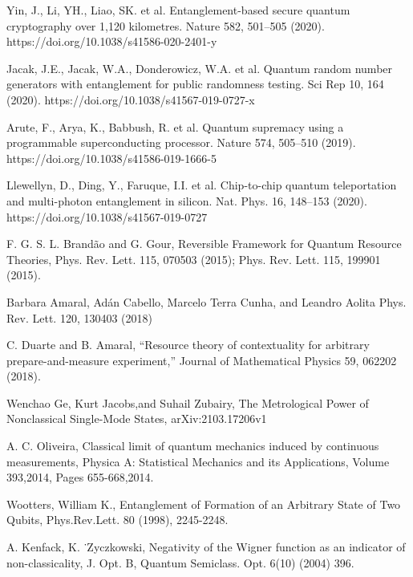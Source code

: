 \documentclass[aps,prl,preprint]{revtex4-1}
\begin{document}
	
	
	\begin{thebibliography}{99}
		
		
		 Yin, J., Li, YH., Liao, SK. et al. Entanglement-based secure quantum cryptography over 1,120 kilometres. Nature 582, 501–505 (2020). https://doi.org/10.1038/s41586-020-2401-y
		
		
		 Jacak, J.E., Jacak, W.A., Donderowicz, W.A. et al. Quantum random number generators with entanglement for public randomness testing. Sci Rep 10, 164 (2020). https://doi.org/10.1038/s41567-019-0727-x
		
		 Arute, F., Arya, K., Babbush, R. et al. Quantum supremacy using a programmable superconducting processor. Nature 574, 505–510 (2019). https://doi.org/10.1038/s41586-019-1666-5
		
		 Llewellyn, D., Ding, Y., Faruque, I.I. et al. Chip-to-chip quantum teleportation and multi-photon entanglement in silicon. Nat. Phys. 16, 148–153 (2020). https://doi.org/10.1038/s41567-019-0727
		
		
		
		 F. G. S. L. Brand\~ao and G. Gour, Reversible Framework for Quantum Resource
		Theories, Phys. Rev. Lett. 115, 070503 (2015);
		Phys. Rev. Lett. 115, 199901 (2015).
		
		
		 Barbara Amaral, Adán Cabello, Marcelo Terra Cunha, and Leandro Aolita Phys. Rev. Lett. 120, 130403 (2018)
		
		
		 C. Duarte and B. Amaral, ``Resource theory of contextuality for arbitrary prepare-and-measure
		experiment,'' Journal of Mathematical Physics 59, 062202 (2018).
		
		 Wenchao Ge, Kurt Jacobs,and Suhail Zubairy, The Metrological Power of Nonclassical Single-Mode States, arXiv:2103.17206v1
		
		 A. C. Oliveira, Classical limit of quantum mechanics induced by continuous measurements, Physica A: Statistical Mechanics and its Applications, Volume 393,2014, Pages 655-668,2014.
		
		 Wootters, William K., Entanglement of Formation of an Arbitrary State of Two Qubits, Phys.Rev.Lett. 80 (1998),
		2245-2248.
		
		
		 A. Kenfack, K. ˙Zyczkowski, Negativity of the Wigner function as an indicator of non-classicality, J. Opt. B, Quantum Semiclass. Opt. 6(10) (2004) 396.
		

\end{thebibliography}
\end{document}
